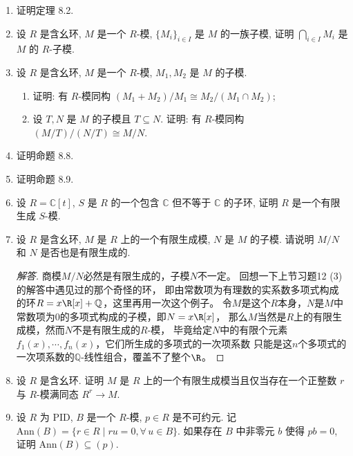 \begin{enumerate}

\item 证明定理 8.2.

\item 设 $ R $ 是含幺环, $ M $ 是一个 $ R $-模, $\{M_i\}_{i \in I}$ 是 $ M $ 的一族子模, 证明 $\bigcap\limits_{i \in I} M_i$ 是 $ M $ 的 $ R $-子模.

\item 设 $ R $ 是含幺环, $ M $ 是一个 $ R $-模, $ M_1, M_2 $ 是 $ M $ 的子模.
\begin{enumerate}[label=(\arabic*)]
    \item 证明: 有 $ R $-模同构 $(M_1 + M_2)/M_1 \cong M_2/(M_1 \cap M_2)$; 
    \item 设 $ T, N $ 是 $ M $ 的子模且 $ T \subseteq N $. 证明: 有 $ R $-模同构 $(M/T)/(N/T) \cong M/N$.
\end{enumerate}

\item 证明命题 8.8.

\item 证明命题 8.9.

\item 设 $ R = \mathbb{C}[t] $, $ S $ 是 $ R $ 的一个包含 $ \mathbb{C} $ 但不等于 $ \mathbb{C} $ 的子环, 证明 $ R $ 是一个有限生成 $ S $-模.

\item 设 $ R $ 是含幺环, $ M $ 是 $ R $ 上的一个有限生成模, $ N $ 是 $ M $ 的子模. 请说明 $ M/N $ 和 $ N $ 是否也是有限生成的.
\begin{proof}[解答]
    商模$M/N$必然是有限生成的，子模$N$不一定。
    回想一下上节习题12 (3)的解答中遇见过的那个奇怪的环，
    即由常数项为有理数的实系数多项式构成的环$R=x\R[x]+\mathbb{Q}$，这里再用一次这个例子。
    令$M$是这个$R$本身，$N$是$M$中常数项为$0$的多项式构成的子模，即$N=x\R[x]$，
    那么$M$当然是$R$上的有限生成模，然而$N$不是有限生成的$R$-模，
    毕竟给定$N$中的有限个元素$f_1(x),\cdots,f_n(x)$，它们所生成的多项式的一次项系数
    只能是这$n$个多项式的一次项系数的$\mathbb{Q}$-线性组合，覆盖不了整个$\R$。
\end{proof}

\item 设 $ R $ 是含幺环. 证明 $ M $ 是 $ R $ 上的一个有限生成模当且仅当存在一个正整数 $ r $ 与 $ R $-模满同态 $ R^r \to M $.

\item 设 $ R $ 为 PID, $ B $ 是一个 $ R $-模, $ p \in R $ 是不可约元. 记 $ \mathrm{Ann}(B) = \{r \in R \mid ru = 0, \forall \, u \in B\} $. 如果存在 $ B $ 中非零元 $ b $ 使得 $ pb = 0 $, 证明 $ \mathrm{Ann}(B) \subseteq (p) $.


\end{enumerate}
